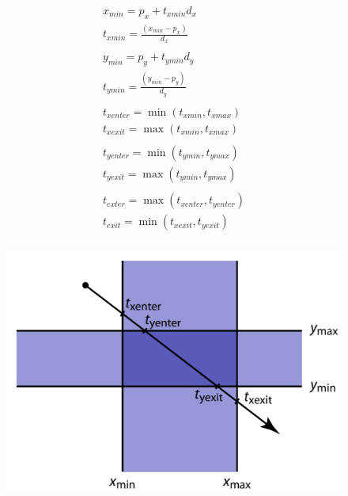 \begin{equation} \label{eq:slabs}
	\begin{gathered}
		x_{min} = p_x + t_{xmin} d_x\\
		t_{xmin} = \frac{(x_{min} - p_x)}{d_x}\\
		\\
		y_{min} = p_y + t_{ymin} d_y\\
		t_{ymin} = \frac{(y_{min} - p_y)}{d_y}\\
		\\
		t_{xenter} = \min(t_{xmin}, t_{xmax})\\
		t_{xexit} = \max(t_{xmin}, t_{xmax})\\
		\\
		t_{yenter} = \min(t_{ymin}, t_{ymax})\\
		t_{yexit} = \max(t_{ymin}, t_{ymax})\\
		\\
		t_{exter} = \max(t_{xenter}, t_{yenter})\\
		t_{exit} = \min(t_{xexit}, t_{yexit})\\
	\end{gathered}
\end{equation}

\begin{figure}[H]
	\centering
	\includegraphics[scale=1.3]{obrazky-figures/slab_intersect.png}
	\captionsetup{justification=centering}
	\label{fig:slabs}
\end{figure}


